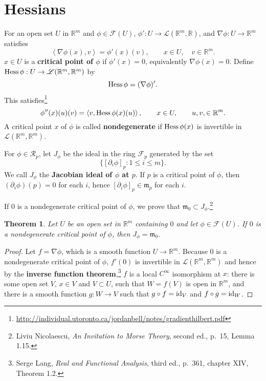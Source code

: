 \documentclass{article}
\newcommand{\inner}[2]{\left\langle #1, #2 \right\rangle}
\newcommand{\id}{\ensuremath\mathrm{id}}
\newcommand{\Hess}{\ensuremath\mathrm{Hess}\,}
\newtheorem{theorem}{Theorem}
\theoremstyle{definition}
\begin{document}
\section{Hessians}
For an open set $U$ in $\mathbb{R}^m$ and $\phi \in \mathcal{F}(U)$, 
$\phi':U \to \mathscr{L}(\mathbb{R}^m,\mathbb{R})$, and $\nabla \phi:U \to \mathbb{R}^m$ satisfies
\[
\inner{\nabla \phi(x)}{v} = \phi'(x)(v),\qquad x \in U,\quad v \in \mathbb{R}^m.
\]
$x \in U$ is a \textbf{critical point of $\phi$} if
$\phi'(x)=0$, equivalently
$\nabla \phi(x)=0$.
Define $\Hess \phi:U \to \mathscr{L}(\mathbb{R}^m,\mathbb{R}^m)$ by
\[
\Hess \phi = (\nabla \phi)'.
\]
This satisfies\footnote{\url{http://individual.utoronto.ca/jordanbell/notes/gradienthilbert.pdf}}
\[
\phi''(x)(u)(v) = \inner{v}{\Hess \phi(x)(u)},\qquad x \in U,\qquad u,v, \in \mathbb{R}^m.
\]
A critical point $x$ of $\phi$ is called \textbf{nondegenerate} if $\Hess \phi(x)$ is invertible
in $\mathscr{L}(\mathbb{R}^m,\mathbb{R}^m)$. 



For $\phi \in \mathcal{R}_p$, let $J_\phi$ be the ideal in the ring $\mathcal{F}_p$ generated by the set
\[
\{[\partial_i \phi]_p: 1 \leq i \leq m\}.
\]
We call $J_\phi$ the \textbf{Jacobian ideal of $\phi$ at $p$}.
If $p$ is a critical point of $\phi$, then
$(\partial_i \phi)(p)=0$ for each $i$, hence
$[\partial_i \phi]_p \in \mathfrak{m}_p$ for each $i$.

If $0$ is a nondegenerate critical point of $\phi$, we 
prove that $\mathfrak{m}_0 \subset J_\phi$.\footnote{Liviu Nicolaescu, {\em An Invitation to Morse Theory}, second ed.,
p.~15, Lemma 1.15.}

\begin{theorem}
Let $U$ be an open set in $\mathbb{R}^m$ containing $0$ and let $\phi \in \mathcal{F}(U)$.
If $0$ is a nondegenerate critical point of $\phi$, then
$J_\phi = \mathfrak{m}_0$.
\end{theorem}
\begin{proof}
Let $f=\nabla \phi$, which is a smooth function $U \to \mathbb{R}^m$. 
Because $0$ is a nondegenerate critical point of $\phi$,
$f'(0)$ is invertible in $\mathscr{L}(\mathbb{R}^m,\mathbb{R}^m)$ and 
hence by the \textbf{inverse function theorem},\footnote{Serge Lang,
{\em Real and Functional Analysis}, third ed., p.~361, chapter XIV, Theorem 1.2.}
$f$ is a local $C^\infty$ isomorphism at $x$: 
there is some open set $V$, $x \in V$ and $V \subset U$, such that $W=f(V)$ is open in $\mathbb{R}^m$,
and there is a smooth function $g:W \to V$ such that
$g \circ f = \id_V$ and $f \circ g = \id_W$. 
\end{proof}
\end{document}
